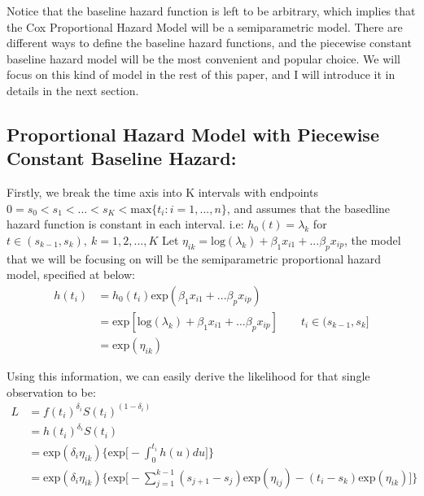 \documentclass[]{article}
\begin{document}
Notice that the baseline hazard function is left to be arbitrary, which
implies that the Cox Proportional Hazard Model will be a semiparametric
model. There are different ways to define the baseline hazard functions,
and the piecewise constant baseline hazard model will be the most
convenient and popular choice. We will focus on this kind of model in
the rest of this paper, and I will introduce it in details in the next
section.

\hypertarget{proportional-hazard-model-with-piecewise-constant-baseline-hazard}{%
\subsection{Proportional Hazard Model with Piecewise Constant Baseline
Hazard:}\label{proportional-hazard-model-with-piecewise-constant-baseline-hazard}}

Firstly, we break the time axis into K intervals with endpoints
\(0=s_0<s_1<...<s_K < \text{max}\{t_i:i=1,...,n\}\), and assumes that
the basedline hazard function is constant in each interval. i.e:
\(h_0(t) = \lambda_k\) for \(t\in(s_{k-1},s_k), \ k=1,2, ...,K\) Let
\(\eta_{ik} = \text{log}(\lambda_k)+\beta_1x_{i1}+...\beta_px_{ip}\),
the model that we will be focusing on will be the semiparametric
proportional hazard model, specified at below:
\begin{equation}\begin{aligned}\label{eqn:phmodel}
h(t_i) &= h_0(t_i)\text{exp}(\beta_1x_{i1}+...\beta_px_{ip})\\
       &= \text{exp}[\text{log}(\lambda_k)+\beta_1x_{i1}+...\beta_px_{ip}] \qquad t_i\in(s_{k-1},s_k] \\
       &= \text{exp}(\eta_{ik})
\end{aligned}\end{equation}

Using this information, we can easily derive the likelihood for that
single observation to be:
\begin{equation}\begin{aligned}\label{eqn:singlelike}
L &= f(t_i)^{\delta_i}S(t_i)^{(1- \delta_i)}\\
  &= h(t_i)^{\delta_i}S(t_i) \\
  &= \text{exp}(\delta_i \eta_{ik})\bigg\{ \text{exp} \big[ -\int_{0}^{t_i} h(u) du\big ] \bigg\} \\
  &= \text{exp}(\delta_i \eta_{ik})\bigg \{\text{exp}\big[-\sum_{j=1}^{k-1} (s_{j+1}-s_j)\text {exp} (\eta_{ij}) - (t_i-s_k)\text{exp}(\eta_{ik})\big]\bigg \}\\
\end{aligned}\end{equation}
\end{document}
